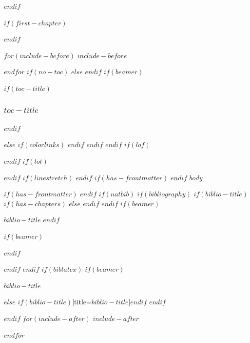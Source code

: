 \documentclass[
$if(fontsize)$
  $fontsize$,
$endif$
$if(papersize)$
  $papersize$paper,
$else$
  paper=a4,
$endif$
$if(beamer)$
  ignorenonframetext,
$if(handout)$
  handout,
$endif$
$if(aspectratio)$
  aspectratio=$aspectratio$,
$endif$
$endif$
$for(classoption)$
  $classoption$$sep$,
$endfor$
  ,captions=tableheading
]{$if(beamer)$$documentclass$$else$$if(book)$scrbook$else$scrartcl$endif$$endif$}
\newif\ifbibliography
\begin{document}
$endif$
\setcounter{page}{0} %


$if(first-chapter)$
\setcounter{chapter}{$first-chapter$}
\addtocounter{chapter}{-1}
$endif$

$for(include-before)$
$include-before$

$endfor$
$if(no-toc)$
$else$
\renewcommand*\contentsname{$toc-title$}
\renewcommand*\contentsname{Table of Contents}
$endif$
$if(beamer)$
\begin{frame}[allowframebreaks]
$if(toc-title)$
  \frametitle{$toc-title$}
$endif$
  \tableofcontents[hideallsubsections]
\end{frame}
\newpage
$else$
{
$if(colorlinks)$
\hypersetup{linkcolor=$if(toccolor)$$toccolor$$else$$endif$}
$endif$
\setcounter{tocdepth}{$toc-depth$}
\tableofcontents
\newpage
}
$endif$
$endif$
$if(lof)$
\listoffigures
$endif$
$if(lot)$
\listoftables
$endif$
$if(linestretch)$
$endif$
$if(has-frontmatter)$
\mainmatter
$endif$
$body$

$if(has-frontmatter)$
\backmatter
$endif$
$if(natbib)$
$if(bibliography)$
$if(biblio-title)$
$if(has-chapters)$
\renewcommand\bibname{$biblio-title$}
$else$
\renewcommand\refname{$biblio-title$}
$endif$
$endif$
$if(beamer)$
\begin{frame}[allowframebreaks]{$biblio-title$}
  \bibliographytrue
$endif$
  
$if(beamer)$
\end{frame}
$endif$

$endif$
$endif$
$if(biblatex)$
$if(beamer)$
\begin{frame}[allowframebreaks]{$biblio-title$}
  \bibliographytrue
  \printbibliography[heading=none]
\end{frame}
$else$
\printbibliography$if(biblio-title)$[title=$biblio-title$]$endif$
$endif$

$endif$
$for(include-after)$
$include-after$

$endfor$
\end{document}
